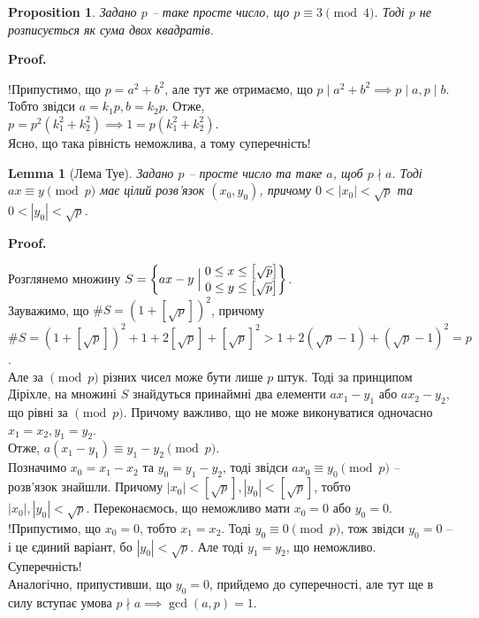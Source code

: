 \documentclass[a4paper, 14pt]{extarticle}
\makeatletter
\theoremstyle{theoremdd}
\theoremstyle{theoremdd}
\theoremstyle{theoremdd}
\theoremstyle{theoremdd}
\theoremstyle{theoremdd}
\newtheorem{proposition}[theorem]{Proposition}
\theoremstyle{theoremdd}
\theoremstyle{theoremdd}
\newtheorem{lemma}[theorem]{Lemma}
\theoremstyle{theoremdd}
\def\qed{$\blacksquare$}
\renewenvironment{proof}[1][Proof.\\]{\par
\pushQED{\hfill \qed}%
\normalfont \topsep6\p@\@plus6\p@\relax
\trivlist
\item\relax
{\bfseries
#1\@addpunct{.}}\hspace\labelsep\ignorespaces
}{%
\popQED\endtrivlist\@endpefalse
}
\makeatother
\begin{document}
\begin{proposition}
\label{p equiv 3 mod 4 implies no sum of two squares}
Задано $p$ -- таке просте число, що $p \equiv 3 \pmod 4$. Тоді $p$ не розписується як сума двох квадратів.
\end{proposition}

\begin{proof}
!Припустимо, що $p = a^2+b^2$, але тут же отримаємо, що $p \mid a^2+b^2 \implies p \mid a, p \mid b$. Тобто звідси $a = k_1p, b = k_2p$. Отже, \\
$p = p^2(k_1^2+k_2^2) \implies 1 = p(k_1^2+k_2^2)$. \\
Ясно, що така рівність неможлива, а тому суперечність!
\end{proof}

\begin{lemma}[Лема Туе]
Задано $p$ -- просте число та таке $a$, щоб $p \nmid a$. Тоді $ax \equiv y \pmod p$ має цілий розв'язок $(x_0,y_0)$, причому $0 < |x_0| < \sqrt{p}$ та $0 < |y_0| < \sqrt{p}$.
\end{lemma}

\begin{proof}
Розглянемо множину $S = \left\{ax-y \Bigm| \substack{\textstyle 0 \leq x \leq \left[\sqrt{p}\right] \\ \textstyle  0 \leq y \leq \left[\sqrt{p}\right]}\right\}$. \\ Зауважимо, що $\# S = (1+\left[\sqrt{p}\right])^2$, причому\\
$\# S = (1 + \left[\sqrt{p}\right])^2  + 1 + 2 \left[\sqrt{p}\right] + \left[\sqrt{p}\right]^2 > 1 + 2 (\sqrt{p}-1) + (\sqrt{p}-1)^2 = p$.\\
Але за $\!\! \pmod p$ різних чисел може бути лише $p$ штук. Тоді за принципом Діріхле, на множині $S$ знайдуться принаймні два елементи $ax_1-y_1$ або $ax_2-y_2$, що рівні за $\!\pmod p$. Причому важливо, що не може виконуватися одночасно $x_1 = x_2, y_1 = y_2$.\\
Отже, $a(x_1-y_1) \equiv y_1-y_2 \pmod p$.\\
Позначимо $x_0 = x_1-x_2$ та $y_0 = y_1-y_2$, тоді звідси $ax_0 \equiv y_0 \pmod p$ -- розв'язок знайшли. Причому $|x_0| < [\sqrt{p}], |y_0| < [\sqrt{p}]$, тобто\\
$|x_0|,|y_0| < \sqrt{p}$. Переконаємось, що неможливо мати $x_0 = 0$ або $y_0 = 0$.\\
!Припустимо, що $x_0 = 0$, тобто $x_1 = x_2$. Тоді $y_0 \equiv 0 \pmod p$, тож звідси $y_0 = 0$ -- і це єдиний варіант, бо $|y_0| < \sqrt{p}$. Але тоді $y_1 = y_2$, що неможливо. Суперечність!\\
Аналогічно, припустивши, що $y_0 = 0$, прийдемо до суперечності, але тут ще в силу вступає умова $p \nmid a \implies \gcd(a,p) = 1$.
\end{proof}
\end{document}
